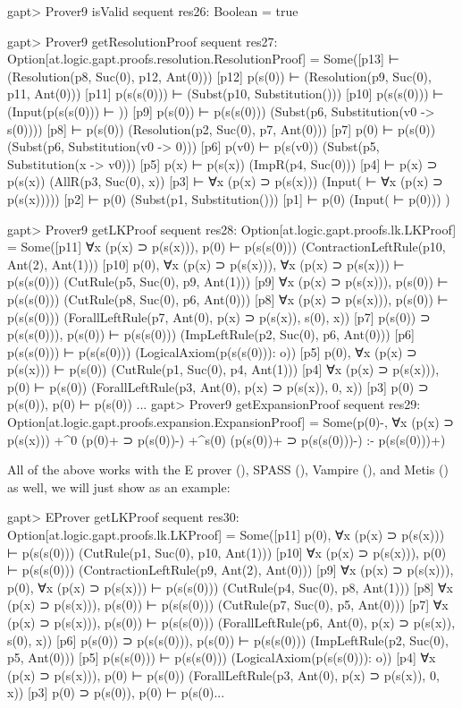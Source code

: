 \documentclass[a4paper,11pt]{article}
\newcommand{\cli}[1]{{\ttfamily {#1}}}
\begin{document}
\begin{clilisting}
gapt> Prover9 isValid sequent
res26: Boolean = true

gapt> Prover9 getResolutionProof sequent
res27: Option[at.logic.gapt.proofs.resolution.ResolutionProof] =
Some([p13]  ⊢    (Resolution(p8, Suc(0), p12, Ant(0)))
[p12] p(s(0)) ⊢    (Resolution(p9, Suc(0), p11, Ant(0)))
[p11] p(s(s(0))) ⊢    (Subst(p10, Substitution()))
[p10] p(s(s(0))) ⊢    (Input(p(s(s(0))) ⊢ ))
[p9] p(s(0)) ⊢ p(s(s(0)))   (Subst(p6, Substitution(v0 -> s(0))))
[p8]  ⊢ p(s(0))   (Resolution(p2, Suc(0), p7, Ant(0)))
[p7] p(0) ⊢ p(s(0))   (Subst(p6, Substitution(v0 -> 0)))
[p6] p(v0) ⊢ p(s(v0))   (Subst(p5, Substitution(x -> v0)))
[p5] p(x) ⊢ p(s(x))   (ImpR(p4, Suc(0)))
[p4]  ⊢ p(x) ⊃ p(s(x))   (AllR(p3, Suc(0), x))
[p3]  ⊢ ∀x (p(x) ⊃ p(s(x)))   (Input( ⊢ ∀x (p(x) ⊃ p(s(x)))))
[p2]  ⊢ p(0)   (Subst(p1, Substitution()))
[p1]  ⊢ p(0)   (Input( ⊢ p(0)))
)

gapt> Prover9 getLKProof sequent
res28: Option[at.logic.gapt.proofs.lk.LKProof] =
Some([p11] ∀x (p(x) ⊃ p(s(x))), p(0) ⊢ p(s(s(0)))    (ContractionLeftRule(p10, Ant(2), Ant(1)))
[p10] p(0), ∀x (p(x) ⊃ p(s(x))), ∀x (p(x) ⊃ p(s(x))) ⊢ p(s(s(0)))    (CutRule(p5, Suc(0), p9, Ant(1)))
[p9] ∀x (p(x) ⊃ p(s(x))), p(s(0)) ⊢ p(s(s(0)))    (CutRule(p8, Suc(0), p6, Ant(0)))
[p8] ∀x (p(x) ⊃ p(s(x))), p(s(0)) ⊢ p(s(s(0)))    (ForallLeftRule(p7, Ant(0), p(x) ⊃ p(s(x)), s(0), x))
[p7] p(s(0)) ⊃ p(s(s(0))), p(s(0)) ⊢ p(s(s(0)))    (ImpLeftRule(p2, Suc(0), p6, Ant(0)))
[p6] p(s(s(0))) ⊢ p(s(s(0)))    (LogicalAxiom(p(s(s(0))): o))
[p5] p(0), ∀x (p(x) ⊃ p(s(x))) ⊢ p(s(0))    (CutRule(p1, Suc(0), p4, Ant(1)))
[p4] ∀x (p(x) ⊃ p(s(x))), p(0) ⊢ p(s(0))    (ForallLeftRule(p3, Ant(0), p(x) ⊃ p(s(x)), 0, x))
[p3] p(0) ⊃ p(s(0)), p(0) ⊢ p(s(0))  ...
gapt> Prover9 getExpansionProof sequent
res29: Option[at.logic.gapt.proofs.expansion.ExpansionProof] =
Some(p(0)-,
∀x (p(x) ⊃ p(s(x)))
  +^{0} (p(0)+ ⊃ p(s(0))-)
  +^{s(0)} (p(s(0))+ ⊃ p(s(s(0)))-)
:-
p(s(s(0)))+)

\end{clilisting}

All of the above works with the E prover (\cli{EProver}), SPASS (\cli{SPASS}),
Vampire (\cli{Vampire}), and Metis (\cli{Metis}) as well, we will just show
\cli{EProver.getLKProof} as an example:
\begin{clilisting}
gapt> EProver getLKProof sequent
res30: Option[at.logic.gapt.proofs.lk.LKProof] =
Some([p11] p(0), ∀x (p(x) ⊃ p(s(x))) ⊢ p(s(s(0)))    (CutRule(p1, Suc(0), p10, Ant(1)))
[p10] ∀x (p(x) ⊃ p(s(x))), p(0) ⊢ p(s(s(0)))    (ContractionLeftRule(p9, Ant(2), Ant(0)))
[p9] ∀x (p(x) ⊃ p(s(x))), p(0), ∀x (p(x) ⊃ p(s(x))) ⊢ p(s(s(0)))    (CutRule(p4, Suc(0), p8, Ant(1)))
[p8] ∀x (p(x) ⊃ p(s(x))), p(s(0)) ⊢ p(s(s(0)))    (CutRule(p7, Suc(0), p5, Ant(0)))
[p7] ∀x (p(x) ⊃ p(s(x))), p(s(0)) ⊢ p(s(s(0)))    (ForallLeftRule(p6, Ant(0), p(x) ⊃ p(s(x)), s(0), x))
[p6] p(s(0)) ⊃ p(s(s(0))), p(s(0)) ⊢ p(s(s(0)))    (ImpLeftRule(p2, Suc(0), p5, Ant(0)))
[p5] p(s(s(0))) ⊢ p(s(s(0)))    (LogicalAxiom(p(s(s(0))): o))
[p4] ∀x (p(x) ⊃ p(s(x))), p(0) ⊢ p(s(0))    (ForallLeftRule(p3, Ant(0), p(x) ⊃ p(s(x)), 0, x))
[p3] p(0) ⊃ p(s(0)), p(0) ⊢ p(s(0)...
\end{clilisting}
\end{document}
